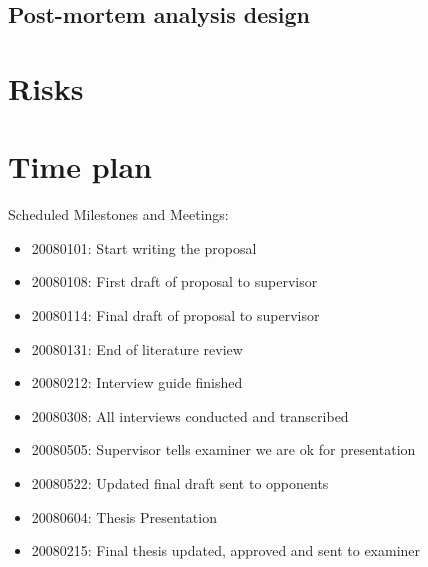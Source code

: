 \documentclass[10pt,a4paper]{proposal}
\begin{document}
	\subsection{Post-mortem analysis design}


\section*{Risks}


\section*{Time plan}
Scheduled Milestones and Meetings:
\begin{itemize}
\item 20080101: Start writing the proposal
\item 20080108: First draft of proposal to supervisor
\item 20080114: Final draft of proposal to supervisor
\item 20080131: End of literature review
\item 20080212: Interview guide finished
\item 20080308: All interviews conducted and transcribed
\item 20080505: Supervisor tells examiner we are ok for presentation
\item 20080522: Updated final draft sent to opponents
\item 20080604: Thesis Presentation
\item 20080215: Final thesis updated, approved and sent to examiner
\end{itemize}

\footnotesize


 
 
\end{document}
